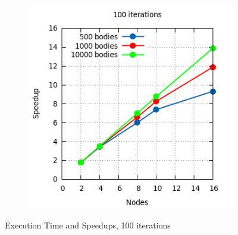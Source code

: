 \documentclass[a4paper]{article}
\begin{document}
\begin{figure}[ht]
\begin{subfigure}{.5\textwidth}
\end{subfigure} %
\begin{subfigure}{.5\textwidth}
  \centering
  \includegraphics[width=1\linewidth]{results/graph16}
\end{subfigure} 
  \caption{Execution Time and Speedups, 100 iterations}
  \label{fig:R2}
\end{figure}
\FloatBarrier
\end{document}

